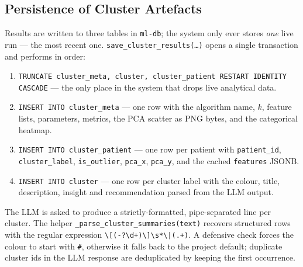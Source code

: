 \subsection{Persistence of Cluster Artefacts}

Results are written to three tables in \texttt{ml-db}; the system only ever stores \emph{one} live run --- the most recent one. \texttt{save\_cluster\_results(\ldots)} opens a single transaction and performs in order:
\begin{enumerate}
    \item \texttt{TRUNCATE cluster\_meta, cluster, cluster\_patient RESTART IDENTITY CASCADE} --- the only place in the system that drops live analytical data.
    \item \texttt{INSERT INTO cluster\_meta} --- one row with the algorithm name, $k$, feature lists, parameters, metrics, the PCA scatter as PNG bytes, and the categorical heatmap.
    \item \texttt{INSERT INTO cluster\_patient} --- one row per patient with \texttt{patient\_id}, \texttt{cluster\_label}, \texttt{is\_outlier}, \texttt{pca\_x}, \texttt{pca\_y}, and the cached \texttt{features} JSONB.
    \item \texttt{INSERT INTO cluster} --- one row per cluster label with the colour, title, description, insight and recommendation parsed from the LLM output.
\end{enumerate}

The LLM is asked to produce a strictly-formatted, pipe-separated line per cluster. The helper \texttt{\_parse\_cluster\_summaries(text)} recovers structured rows with the regular expression \texttt{\textbackslash[(-?\textbackslash d+)\textbackslash]\textbackslash s*\textbackslash|(.+)}. A defensive check forces the colour to start with \texttt{\#}, otherwise it falls back to the project default; duplicate cluster ids in the LLM response are deduplicated by keeping the first occurrence.
